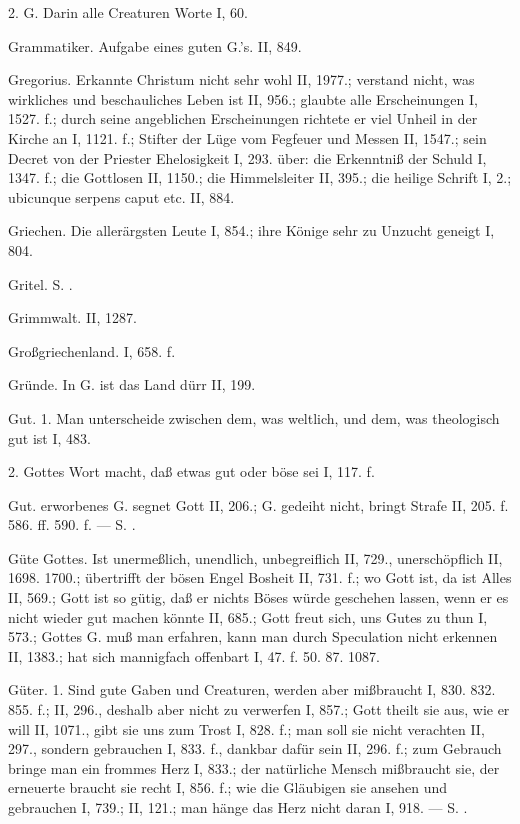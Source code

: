 2. G.  Darin alle Creaturen Worte I, 60.

Grammatiker. Aufgabe eines guten G.’s. II, 849.

Gregorius. Erkannte Christum nicht sehr wohl II, 1977.; verstand nicht, was wirkliches und beschauliches Leben ist II, 956.; glaubte alle Erscheinungen I, 1527. f.; durch seine angeblichen Erscheinungen richtete er viel Unheil in der Kirche an I, 1121. f.; Stifter der Lüge vom Fegfeuer und Messen II, 1547.; sein Decret von der Priester Ehelosigkeit I, 293.  über: die Erkenntniß der Schuld I, 1347. f.; die Gottlosen II, 1150.; die Himmelsleiter II, 395.; die heilige Schrift I, 2.; ubicunque serpens caput etc. II, 884.

Griechen. Die allerärgsten Leute I, 854.; ihre Könige sehr zu Unzucht geneigt I, 804.

Gritel. S. .

Grimmwalt. II, 1287.

Großgriechenland. I, 658. f.

Gründe. In G. ist das Land dürr II, 199.

Gut. 1.  Man unterscheide zwischen dem, was weltlich, und dem, was theologisch gut ist I, 483.

2.  Gottes Wort macht, daß etwas gut oder böse sei I, 117. f.

Gut.  erworbenes G. segnet Gott II, 206.;  G. gedeiht nicht, bringt Strafe II, 205. f. 586. ff. 590. f. — S. .

Güte Gottes. Ist unermeßlich, unendlich, unbegreiflich II, 729., unerschöpflich II, 1698. 1700.; übertrifft der bösen Engel Bosheit II, 731. f.; wo Gott ist, da ist Alles II, 569.; Gott ist so gütig, daß er nichts Böses würde geschehen lassen, wenn er es nicht wieder gut machen könnte II, 685.; Gott freut sich, uns Gutes zu thun I, 573.; Gottes G. muß man erfahren, kann man durch Speculation nicht erkennen II, 1383.; hat sich mannigfach offenbart I, 47. f. 50. 87. 1087.

Güter. 1.  Sind gute Gaben und Creaturen, werden aber mißbraucht I, 830. 832. 855. f.; II, 296., deshalb aber nicht zu verwerfen I, 857.; Gott theilt sie aus, wie er will II, 1071., gibt sie uns zum Trost I, 828. f.; man soll sie nicht verachten II, 297., sondern gebrauchen I, 833. f., dankbar dafür sein II, 296. f.; zum Gebrauch bringe man ein frommes Herz I, 833.; der natürliche Mensch mißbraucht sie, der erneuerte braucht sie recht I, 856. f.; wie die Gläubigen sie ansehen und gebrauchen I, 739.; II, 121.; man hänge das Herz nicht daran I, 918. — S. .

